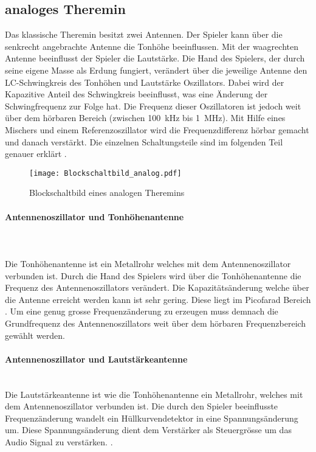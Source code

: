 \subsection{analoges Theremin}\label{subsec:Theremin_analog}
Das klassische Theremin besitzt zwei Antennen. Der Spieler kann über die senkrecht angebrachte Antenne  die  Tonhöhe beeinflussen. Mit der waagrechten Antenne beeinflusst der Spieler die Lautstärke. Die Hand des Spielers, der durch seine eigene Masse als Erdung fungiert, verändert über die jeweilige Antenne den LC-Schwingkreis des Tonhöhen und Lautstärke Oszillators. Dabei wird der Kapazitive Anteil des Schwingkreis beeinflusst, was eine Änderung der Schwingfrequenz zur Folge hat. 
 Die Frequenz dieser Oszillatoren ist jedoch weit über dem hörbaren Bereich (zwischen \SI{100}{kHz} bis \SI{1}{MHz}). Mit Hilfe eines Mischers und einem Referenzoszillator wird die Frequenzdifferenz hörbar gemacht und danach verstärkt. Die einzelnen Schaltungsteile sind im folgenden Teil genauer erklärt \cite{Franzis}.

\begin{figure}[h]
	\centering
	\texttt{[image: Blockschaltbild\_analog.pdf]}
	\caption{Blockschaltbild eines analogen Theremins}
	\label{img:Blockschaltbild_analog}
\end{figure}

\paragraph{Antennenoszillator und Tonhöhenantenne}\mbox{}\\ 
\\Die Tonhöhenantenne ist ein Metallrohr welches mit dem Antennenoszillator verbunden ist.
Durch die Hand des Spielers wird über die Tonhöhenantenne die Frequenz des Antennenoszillators verändert. Die Kapazitätsänderung welche über die Antenne erreicht werden kann ist sehr gering. Diese liegt im Picofarad Bereich \cite{physik_theremin}. Um eine genug grosse Frequenzänderung zu erzeugen muss demnach die Grundfrequenz des Antennenoszillators weit über dem hörbaren Frequenzbereich gewählt werden. 

\paragraph{Antennenoszillator und Lautstärkeantenne}\mbox{}\\ 
Die Lautstärkeantenne ist wie die Tonhöhenantenne ein Metallrohr, welches mit dem Antennenoszillator verbunden ist. Die durch den Spieler beeinflusste Frequenzänderung wandelt ein Hüllkurvendetektor in eine Spannungsänderung um. Diese Spannungsänderung dient dem Verstärker als Steuergrösse um das Audio Signal zu verstärken. \cite{Franzis}. 

